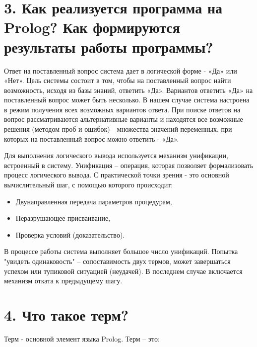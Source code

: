\documentclass[12pt]{report}
\begin{document}
\section*{3. Как реализуется программа на Prolog? Как формируются результаты работы программы?}

Ответ на поставленный вопрос система дает в логической форме - «Да» или «Нет». Цель системы состоит в том, чтобы на поставленный вопрос найти возможность, исходя из базы знаний, ответить «Да». Вариантов ответить «Да» на поставленный вопрос может быть несколько. В нашем случае система настроена в режим получения всех возможных вариантов ответа. При поиске ответов на вопрос рассматриваются альтернативные варианты и находятся все возможные решения (методом проб и ошибок) - множества значений переменных, при которых на поставленный вопрос можно ответить - «Да».

Для выполнения логического вывода используется механизм унификации, встроенный в систему.
Унификация – операция, которая позволяет формализовать процесс логического вывода. С практической точки зрения  - это основной вычислительный шаг, с помощью которого происходит:
\begin{itemize}
	\item Двунаправленная передача параметров процедурам,
	\item Неразрушающее присваивание,
	\item Проверка условий (доказательство).
\end{itemize}

В процессе работы система выполняет большое число унификаций.  Попытка "увидеть одинаковость" – сопоставимость двух термов, может завершаться успехом или тупиковой ситуацией (неудачей). В последнем случае включается механизм отката к предыдущему шагу.

\section*{4. Что такое терм?}

Терм - основной элемент языка Prolog. Терм – это:
\end{document}
